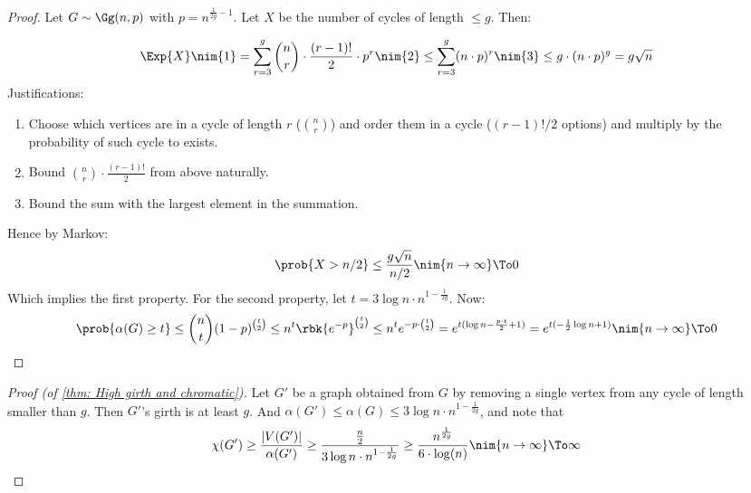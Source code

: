 \documentclass[a4paper, 11pt, oneside]{book}
\begin{document}
\begin{proof}
	Let $G \sim \Gg(n,p)$ with $p = n^{\frac{1}{2g}-1}$. Let $X$ be the number of cycles of length $\le g$. Then:
	
	\[
	\Exp{X}\nim{1}= \sum_{r=3}^g {n\choose r}\cdot \frac{(r-1)!}{2}\cdot p^r\nim{2}\le \sum_{r=3}^g (n\cdot p)^r \nim{3}\le g\cdot (n\cdot p)^g = g\sqrt{n}
	\]
	Justifications:
	\begin{enumerate}
  \item Choose which vertices are in a cycle of length $r$ (${n\choose r}$) and order them in a cycle ($(r-1)!/2$ options) and multiply by the probability of such cycle to exists.
  \item Bound ${n\choose r}\cdot \frac{(r-1)!}{2}$ from above naturally.
  \item Bound the sum with the largest element in the summation.
\end{enumerate}
Hence by Markov:
\[
\prob{X > n/2} \le \frac{g\sqrt{n}}{n/2}\nim{n\to \infty}\To 0
\]
Which implies the first property. For the second property, let $t = 3\log n\cdot n^{1-\frac{1}{2g}}$. Now:
\begin{displaymath}
  \prob{\alpha(G)\ge t}\le {n\choose t}(1-p)^{t\choose 2} \leq n^t\rbk{e^{-p}}^{t\choose 2} \le n^te^{-p\cdot{t\choose 2}} = e^{t(\log n - \frac{p\cdot t}{2} + 1)} = e^{t(-\frac{1}{2}\log n + 1)}\nim{n\to \infty}\To 0
\end{displaymath}


\end{proof}
\begin{proof}
	[Proof (of \ref{thm: High girth and chromatic})] Let $G'$ be a graph obtained from $G$ by removing a single vertex from any cycle of length smaller than $g$. Then $G'$'s girth is at least $g$. And $\alpha(G')\le \alpha(G)\le 3\log n\cdot n^{1-\frac{1}{2g}}$, and note that
	\[
	\chi(G')\ge \frac{|V(G')|}{\alpha(G')}\ge \frac{\frac{n}{2}}{3\log n\cdot n^{1-\frac{1}{2g}}}\ge \frac{n^\frac{1}{2g}}{6\cdot \log(n)}\nim{n\to \infty}\To \infty
	\]
\end{proof}
\end{document}
